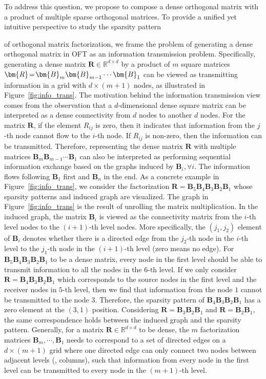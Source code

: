 To address this question, we propose to compose a dense orthogonal matrix with a product of multiple sparse orthogonal matrices. To provide a unified yet intuitive perspective to study the sparsity pattern
{\parfillskip=0pt
\parskip=0pt
\par} 




of orthogonal matrix factorization, we frame the problem of generating a dense orthogonal matrix in OFT as an information transmission problem. Specifically, generating a dense matrix $\bm{R}\in\mathbb{R}^{d\times d}$ by a product of $m$ square matrices $\thickmuskip=2mu \medmuskip=2mu \bm{R}=\bm{B}_m\bm{B}_{m-1}\cdots\bm{B}_1$ can be viewed as transmitting information in a grid with $d\times (m+1)$ nodes, as illustrated in Figure~\ref{fig:info_trans}. The motivation
behind the information transmission view comes from the observation that a $d$-dimensional dense square matrix can be interpreted as a dense connectivity from $d$ nodes to another $d$ nodes. For the matrix $\bm{R}$, if the element $R_{ij}$ is zero, then it indicates that information from the $j$-th node cannot flow to the $i$-th node. If $R_{ij}$ is non-zero, then the information can be transmitted. Therefore, representing the dense matrix $\bm{R}$ with multiple matrices $\bm{B}_m\bm{B}_{m-1}\cdots\bm{B}_1$ can also be interpreted as performing sequential information exchange based on the graphs induced by $\bm{B}_i, \forall i$. The information flows following $\bm{B}_1$ first and $\bm{B}_n$ in the end. As a concrete example in Figure~\ref{fig:info_trans}, we consider the factorization $\bm{R}=\bm{B}_5\bm{B}_4\bm{B}_3\bm{B}_2\bm{B}_1$ whose sparsity patterns and induced graph are visualized. The graph in Figure~\ref{fig:info_trans} is the result of unrolling the matrix multiplication. In the induced graph, the matrix $\bm{B}_i$ is viewed as the connectivity matrix from the $i$-th level nodes to the $(i+1)$-th level nodes. More specifically, the $(j_1,j_2)$ element of $\bm{B}_i$ denotes whether there is a directed edge from the $j_2$-th node in the $i$-th level to the $j_1$-th node in the $(i+1)$-th level (zero means no edge). For $\bm{B}_5\bm{B}_4\bm{B}_3\bm{B}_2\bm{B}_1$ to be a dense matrix, every node in the first level should be able to transmit information to all the nodes in the $6$-th level. If we only consider $\bm{R}=\bm{B}_4\bm{B}_3\bm{B}_2\bm{B}_1$ which corresponds to the source nodes in the first level and the receiver nodes in $5$-th level, then we find that information from the node $1$ cannot be transmitted to the node $3$. Therefore, the sparsity pattern of $\bm{B}_4\bm{B}_3\bm{B}_2\bm{B}_1$ has a zero element at the $(3,1)$ position. Considering $\bm{R}=\bm{B}_3\bm{B}_2\bm{B}_1$ and $\bm{R}=\bm{B}_2\bm{B}_1$, the same correspondence holds between the induced graph and the sparsity pattern. Generally, for a matrix $\bm{R}\in\mathbb{R}^{d\times d}$ to be dense, the $m$ factorization matrices $\bm{B}_m,\cdots,\bm{B}_1$ needs to correspond to a set of directed edges on a $d\times (m+1)$ grid where one directed edge can only connect two nodes between adjacent levels (\ie, columns), such that information from every node in the first level can be transmitted to every node in the $(m+1)$-th level.



